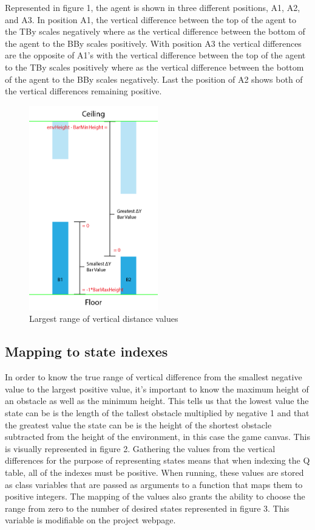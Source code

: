 \documentclass{article}
\begin{document}
Represented in figure 1, the agent is shown in three different positions, A1, A2, and A3. In position A1, the vertical difference between the top of the agent to the TBy scales negatively where as the vertical difference between the bottom of the agent to the BBy scales positively. With position A3 the vertical differences are the opposite of A1's with the vertical difference between the top of the agent to the TBy scales positively where as the vertical difference between the bottom of the agent to the BBy scales negatively. Last the position of A2 shows both of the vertical differences remaining positive. 


\begin{figure}[h!]
    \centering
    \includegraphics[width=0.5\textwidth]{figure2}
    \caption{Largest range of vertical distance values}
    \label{fig:mesh2}
\end{figure}

\subsection{Mapping to state indexes}



In order to know the true range of vertical difference from the smallest negative value to the largest positive value, it's important to know the maximum height of an obstacle as well as the minimum height. This tells us that the lowest value the state can be is the length of the tallest obstacle multiplied by negative 1 and that the greatest value the state can be is the height of the shortest obstacle subtracted from the height of the environment, in this case the game canvas. This is visually represented in figure 2. Gathering the values from the vertical differences for the purpose of representing states means that when indexing the Q table, all of the indexes must be positive. When running, these values are stored as class variables that are passed as arguments to a function that maps them to positive integers. The mapping of the values also grants the ability to choose the range from zero to the number of desired states represented in figure 3. This variable is modifiable on the project webpage. 
\end{document}

